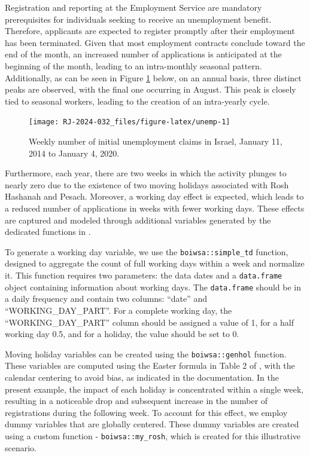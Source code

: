 Registration and reporting at the Employment Service are mandatory prerequisites for individuals seeking to receive an unemployment benefit. Therefore, applicants are expected to register promptly after their employment has been terminated. Given that most employment contracts conclude toward the end of the month, an increased number of applications is anticipated at the beginning of the month, leading to an intra-monthly seasonal pattern. Additionally, as can be seen in Figure \ref{fig:unemp} below, on an annual basis, three distinct peaks are observed, with the final one occurring in August. This peak is closely tied to seasonal workers, leading to the creation of an intra-yearly cycle.

\begin{figure}[H]

{\centering \texttt{[image: RJ-2024-032\_files/figure-latex/unemp-1]} 

}

\caption{Weekly number of initial unemployment claims in Israel, January 11, 2014 to January 4, 2020.}\label{fig:unemp}
\end{figure}

Furthermore, each year, there are two weeks in which the activity plunges to nearly zero due to the existence of two moving holidays associated with Rosh Hashanah and Pesach. Moreover, a working day effect is expected, which leads to a reduced number of applications in weeks with fewer working days. These effects are captured and modeled through additional variables generated by the dedicated functions in .

To generate a working day variable, we use the \texttt{boiwsa::simple\_td} function, designed to aggregate the count of full working days within a week and normalize it. This function requires two parameters: the data dates and a \texttt{data.frame} object containing information about working days. The \texttt{data.frame} should be in a daily frequency and contain two columns: ``date'' and ``WORKING\_DAY\_PART''. For a complete working day, the ``WORKING\_DAY\_PART'' column should be assigned a value of 1, for a half working day 0.5, and for a holiday, the value should be set to 0.

Moving holiday variables can be created using the \texttt{boiwsa::genhol} function. These variables are computed using the Easter formula in Table 2 of \citet{findley1998}, with the calendar centering to avoid bias, as indicated in the documentation. In the present example, the impact of each holiday is concentrated within a single week, resulting in a noticeable drop and subsequent increase in the number of registrations during the following week. To account for this effect, we employ dummy variables that are globally centered. These dummy variables are created using a custom function - \texttt{boiwsa::my\_rosh}, which is created for this illustrative scenario.

